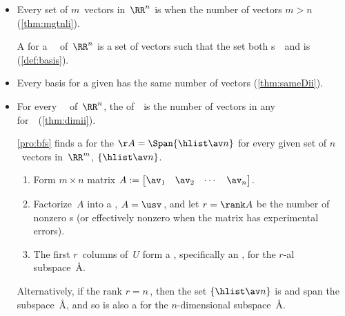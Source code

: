 \begin{itemize}
\itemhi For every \(n\times n\) matrix~\(A\), let \hlist\lambda m\ be distinct s of~\(A\) with corresponding s \hlist\vv m.
Then the set \(\{\hlist \vv m\}\) is  (\cref{thm:indepev}).

\itemme Let \hlist\vv m\ be vectors in~\(\RR^n\),
and let the \(n\times m\) matrix \(V=\begin{bmatrix} \vv_1&\vv_2&\cdots&\vv_m \end{bmatrix}\).  
Then the set \(\{\hlist\vv m\}\) is  if and only if the  system \(V\cv=\ov\) has a nonzero solution~\cv\ (\cref{thm:linhomo}).

\item Every  set of \(m\)~vectors in~\(\RR^n\) is  when the number of vectors \(m>n\) (\cref{thm:mgtnli}).

\itemme A  for a ~\WW\ of~\(\RR^n\) is a set of  vectors such that the set both s~\WW\ and is  (\cref{def:basis}).

\item Every basis for a given  has the same number of vectors (\cref{thm:sameDii}).

\item For every ~\WW\ of~\(\RR^n\),  
the  of~\WW\ is the number of vectors in any  for~\WW\ (\cref{thm:dimii}). 

\itemme \cref{pro:bfs} finds a  for the  \(\AA=\Span\{\hlist\av n\}\) for every given set of $n$~vectors in~\(\RR^m\), $\{\hlist\av n\}$.
\begin{enumerate}
\item Form \(m\times n\) matrix $A:= \begin{bmatrix} \av_1 & \av_2& \cdots&\av_n \end{bmatrix}$. 
\item Factorize~\(A\) into a \svd, $A=\usv$\,, and let \(r=\rank A\) be the number of nonzero s (or effectively nonzero when the matrix has experimental errors).
\item The first \(r\)~columns of~\(U\) form a , specifically an , for the \(r\)-al subspace~\AA.
\end{enumerate}
Alternatively, if the rank \(r=n\)\,, then the set \(\{\hlist\av n\}\) is  and span the subspace~\AA, and so is also a  for the \(n\)-dimensional subspace~\AA.



\end{itemize}
